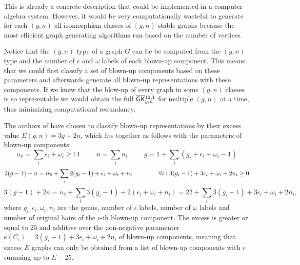 This is already a concrete description that could be implemented in a computer algebra system. However, it would be very computationally wasteful to generate for each $(g,n)$ all isomorphism classes of $(g,n)$-stable graphs because the most efficient graph generating algorithms run based on the number of vertices.

Notice that the $(g,n)$ type of a graph $G$ can be be computed from the $(g,n)$ type and the number of $\epsilon$ and $\omega$ labels of each blown-up component. This means that we could first classify a set of blown-up components based on these parameters and afterwards generate all blown-up representations with these components. If we knew that the blow-up of every graph in some $(g,n)$ classes is so representable we would obtain the full $\bGK_{g,n}^{12,1}$ for multiple $(g,n)$ at a time, thus minimizing computational redundancy.

The authors of \cite[Section 3.2]{CLPW2} have chosen to classify blown-up representations by their excess value $E(g,n) = 3g+2n$, which fits together as follows with the parameters of blown-up components:
\[ n_{\bar{v}} = \sum_i\epsilon_i+\omega_i \geq 11 \hspace{1cm} n = \sum_i n_i \hspace{1cm} g = 1+\sum_i(g_i+\epsilon_i+\omega_i-1) \]
\[ 2(g-1)+n = n_{\bar{v}}+\sum_i 2(g_i-1)+\epsilon_i+\omega_i+n_i \hspace{1.5cm}  \forall i: 3(g_i-1)+3\epsilon_i+\omega_i+2n_i \geq 0\]
\[ 3(g-1)+2n = n_{\bar{v}}+\sum_i 3(g_i-1)+2(\epsilon_i+\omega_i+n_i) = 22+\sum_i 3(g_i-1)+3\epsilon_i+\omega_i+2n_i,
\]
where $g_i,\epsilon_i,\omega_i,n_i$ are the genus, number of $\epsilon$ labels, number of $\omega$ labels and number of original hairs of the $i$-th blown-up component. The excess is greater or equal to $25$ and additive over the non-negative paramenter $e(C_i)=3(g_i-1)+3\epsilon_i+\omega_i+2n_i$ of blown-up components, meaning that excess $E$ graphs can only be obtained from a list of blown-up components with $e$ summing up to $E-25$.

